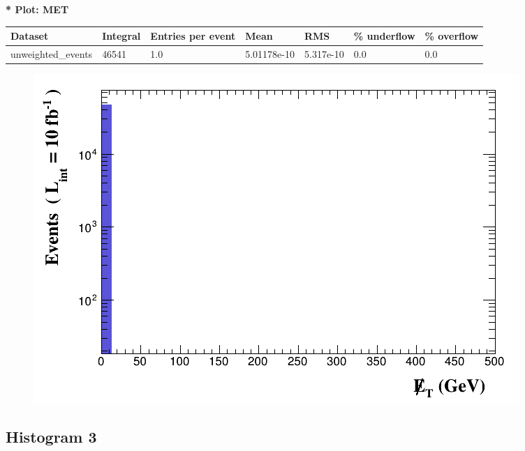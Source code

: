 \documentclass[a4paper, 10pt]{article}
\begin{document}
\textbf{* Plot: MET}\\
   \begin{table}[H]
  \begin{center}
    \begin{tabular}{|m{23.0mm}|m{23.0mm}|m{18.0mm}|m{19.0mm}|m{19.0mm}|m{19.0mm}|m{19.0mm}|}
      \hline
      {\cellcolor{yellow}         Dataset}& {\cellcolor{yellow}         Integral}& {\cellcolor{yellow}         Entries per event}& {\cellcolor{yellow}         Mean}& {\cellcolor{yellow}         RMS}& {\cellcolor{yellow}         \% underflow}& {\cellcolor{yellow}         \% overflow}\\
      \hline
      {\cellcolor{white}         unweighted\_events}& {\cellcolor{white}         46541}& {\cellcolor{white}         1.0}& {\cellcolor{white}         5.01178e-10}& {\cellcolor{white}         5.317e-10}& {\cellcolor{green}         0.0}& {\cellcolor{green}         0.0}\\
\hline
    \end{tabular}
  \end{center}
\end{table}

\begin{figure}[H]
  \begin{center}
    \includegraphics[scale=0.45]{selection_1.png}\\
\caption{   }
  \end{center}
\end{figure}
      \newpage
\subsection{ Histogram 3}
\end{document}
